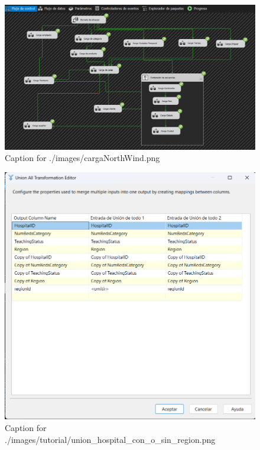 \documentclass{article}
\begin{document}
\begin{figure}[H]
  \centering
  \includegraphics[width=\linewidth]{./images/cargaNorthWind.png}
  \caption{Caption for ./images/cargaNorthWind.png}
\end{figure}
\begin{figure}[H]
  \centering
  \includegraphics[width=\linewidth]{./images/tutorial/union_hospital_con_o_sin_region.png}
  \caption{Caption for ./images/tutorial/union_hospital_con_o_sin_region.png}
\end{figure}
\end{document}
